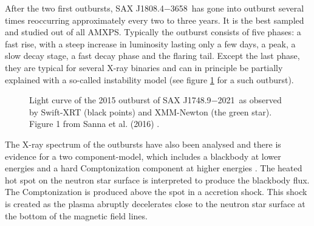\documentclass{wihuri}
\def\source{SAX J1808.4$-$3658}
\def\sourceb{SAX J1748.9$-$2021}
\begin{document}

After the two first outbursts, \source \ has gone into outburst several times reoccurring approximately every two to three years. It is the best sampled and studied out of all AMXPS. Typically the outburst consists of five phases: a fast rise, with a steep increase in luminosity lasting only a few days, a peak, a slow decay stage, a fast decay phase and the flaring tail. Except the last phase, they are typical for several X-ray binaries and can in principle be partially explained with a so-called instability model (see figure \ref{fig:outburst} for a such outburst).




\begin{figure}
\centerline{} 
\caption{Light curve of the 2015 outburst of \sourceb \ as observed by Swift-XRT (black points) and XMM-Newton (the green star). Figure 1 from Sanna et al. (2016) \cite{outburst}.}%
\label{fig:outburst}
\end{figure}







The X-ray spectrum of the outbursts have also been analysed and there is evidence for a two component-model, which includes a blackbody at lower energies and a hard Comptonization component at higher energies \cite{twocompmod} %
. The heated hot spot on the neutron star surface is interpreted to produce the blackbody flux. The Comptonization is produced above the spot in a accretion shock. This shock is created as the plasma abruptly decelerates close to the neutron star surface at the bottom of the magnetic field lines.
\end{document}
